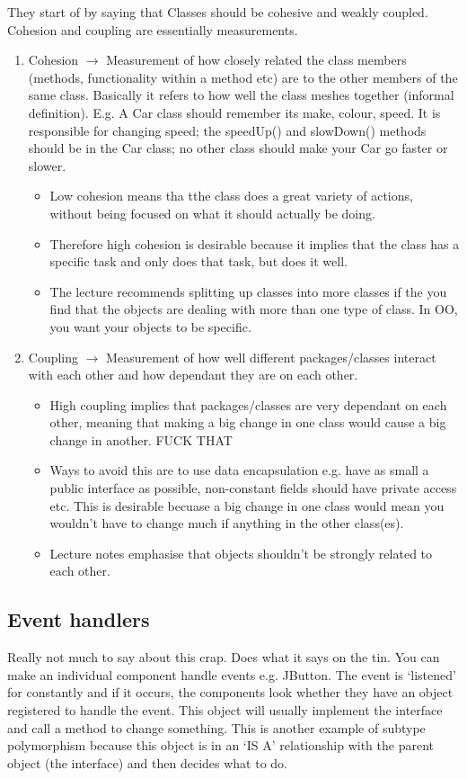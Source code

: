 \documentclass{article}
\begin{document}
They start of by saying that Classes should be cohesive and weakly coupled. Cohesion and coupling
are essentially measurements.
\begin{enumerate}
\item Cohesion $\longrightarrow$ Measurement of how closely related the class members (methods, 
	functionality within a method etc) are to the other members of the same class. Basically
	it refers to how well the class meshes together (informal definition). E.g. A Car class 
	should remember its make, colour, speed. It is responsible for changing speed; the speedUp() 
	and slowDown() methods should be in the Car class; no other class should make your Car go
	faster or slower.
	\begin{itemize}
	   \item Low cohesion means tha tthe class does a great variety of actions, without being 
	focused on what it should actually be doing.
	   \item Therefore high cohesion is desirable because it implies that the class has a specific
		task and only does that task, but does it well. 
	   \item The lecture recommends splitting up classes into more classes if the you find that 
		the objects are dealing with more than one type of class. In OO, you want your objects
		to be specific.
	\end{itemize}	
\item Coupling $\longrightarrow$ Measurement of how well different packages/classes interact with 
	each other and how dependant they are on each other. 
	\begin{itemize}
	   \item High coupling implies that packages/classes are very dependant on each other, meaning
		that making a big change in one class would cause a big change in another. FUCK THAT
	   \item Ways to avoid this are to use data encapsulation e.g. have as small a public interface
		as possible, non-constant fields should have private access etc. This is desirable
		becuase a big change in one class would mean you wouldn't have to change much if 
		anything in the other class(es).
	   \item Lecture notes emphasise that objects shouldn't be strongly related to each other.
	\end{itemize}	
\end{enumerate}

\subsection{Event handlers}
Really not much to say about this crap. Does what it says on the tin. You can make an individual 
component handle events e.g. JButton. The event is `listened' for constantly and if it occurs, the 
components look whether they have an object registered to handle the event. This object will 
usually implement the interface and call a method to change something. This is another example
of subtype polymorphism because this object is in an `IS A' relationship with the parent object
(the interface) and then decides what to do.
\end{document}
